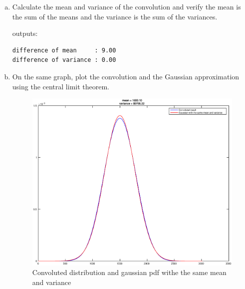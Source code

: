 \begin{enumerate}[(a)]
\item  Calculate the mean and variance of the convolution and verify the mean is the sum of the means and the variance is the sum of the variances.

  outputs:
  \color{lightgray}
\begin{verbatim}
difference of mean     : 9.00
difference of variance : 0.00
\end{verbatim}
  \color{black}

\item  On the same graph, plot the convolution and the Gaussian approximation using the
  central limit theorem.
  \begin{figure}[!h]
    \begin{center}
      \includegraphics[width=6in]{gaussian.eps}
    \end{center}
      \caption{Convoluted distribution and gaussian pdf withe the same mean and variance}
      \label{fig:conv_gauss}
  \end{figure}
\end{enumerate}



